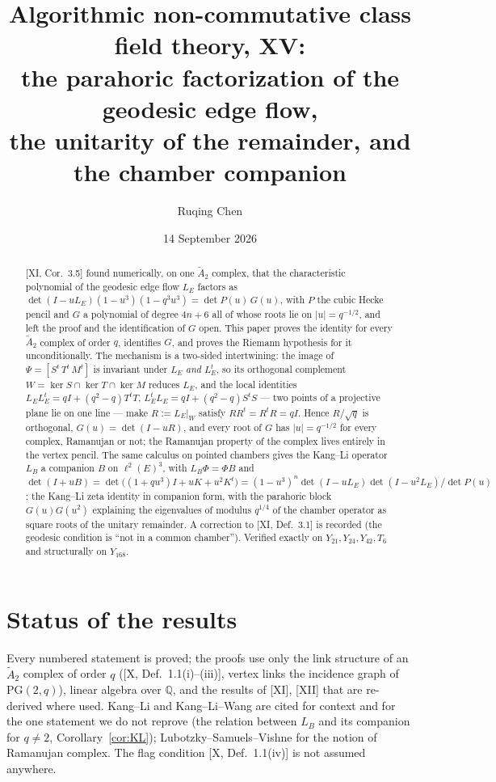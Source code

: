 \documentclass[11pt]{amsart}
\title[Algorithmic non-commutative class field theory, XV]
{Algorithmic non-commutative class field theory, XV:\\
the parahoric factorization of the geodesic edge flow,\\ the unitarity of the remainder,
and the chamber companion}
\author{Ruqing Chen}
\date{14 September 2026}
\numberwithin{equation}{section}
\theoremstyle{definition}
\theoremstyle{remark}
\newcommand{\Q}{\mathbb{Q}}
\newcommand{\LE}{L_E}
\newcommand{\LB}{L_B}
\newcommand{\PG}{\mathrm{PG}}
\newcommand{\Atwo}{\widetilde A_2}
\begin{document}
\begin{abstract}
[XI, Cor.~3.5] found numerically, on one $\Atwo$ complex, that the characteristic polynomial of
the geodesic edge flow $\LE$ factors as $\det(I-u\LE)(1-u^{3})(1-q^{3}u^{3})=\det P(u)\,G(u)$,
with $P$ the cubic Hecke pencil and $G$ a polynomial of degree $4n+6$ all of whose roots lie
on $|u|=q^{-1/2}$, and left the proof and the identification of $G$ open. This paper proves
the identity for every $\Atwo$ complex of order $q$, identifies $G$, and proves the
Riemann hypothesis for it unconditionally. The mechanism is a two-sided intertwining: the
image of $\Psi=[S^{t}\,T^{t}\,M^{t}]$ is invariant under $\LE$ \emph{and} $\LE^{t}$, so its
orthogonal complement $W=\ker S\cap\ker T\cap\ker M$ reduces $\LE$, and the local identities
$\LE\LE^{t}=qI+(q^{2}-q)T^{t}T$, $\LE^{t}\LE=qI+(q^{2}-q)S^{t}S$ --- two points of a projective
plane lie on one line --- make $R:=\LE|_W$ satisfy $RR^{t}=R^{t}R=qI$. Hence $R/\sqrt q$ is
orthogonal, $G(u)=\det(I-uR)$, and every root of $G$ has $|u|=q^{-1/2}$ for every complex,
Ramanujan or not; the Ramanujan property of the complex lives entirely in the vertex pencil.
The same calculus on pointed chambers gives the Kang--Li operator $\LB$ a companion
$B$ on $\ell^{2}(E)^{3}$, with $\LB\Phi=\Phi B$ and
$\det(I+uB)=\det\bigl((1+qu^{3})I+uK+u^{2}K^{t}\bigr)
=(1-u^{3})^{n}\det(I-u\LE)\det(I-u^{2}\LE)/\det P(u)$: the Kang--Li zeta identity in companion
form, with the parahoric block $G(u)G(u^{2})$ explaining the eigenvalues of modulus
$q^{1/4}$ of the chamber operator as square roots of the unitary remainder. A correction to
[XI, Def.~3.1] is recorded (the geodesic condition is ``not in a common chamber''). Verified
exactly on $Y_{21},Y_{24},Y_{42},T_6$ and structurally on $Y_{168}$.
\end{abstract}

\maketitle

\section*{Status of the results}

Every numbered statement is proved; the proofs use only the link structure of an $\Atwo$
complex of order $q$ ([X, Def.~1.1(i)--(iii)], vertex links the incidence graph of
$\PG(2,q)$), linear algebra over $\Q$, and the results of [XI], [XII] that are re-derived where
used. Kang--Li \cite{KL} and Kang--Li--Wang \cite{KLW} are cited for context and for the
one statement we do not reprove (the relation between $\LB$ and its companion for $q\ne2$,
Corollary~\ref{cor:KL}); Lubotzky--Samuels--Vishne \cite{LSV} for the notion of Ramanujan
complex. The flag condition [X, Def.~1.1(iv)] is not assumed anywhere.
\end{document}
